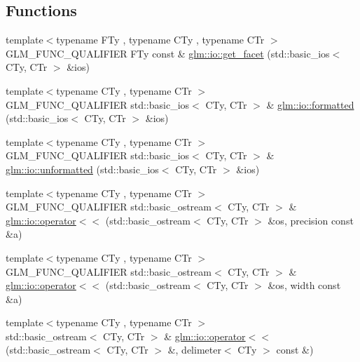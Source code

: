 \subsection*{Functions}
\begin{DoxyCompactItemize}
\item 
{\footnotesize template$<$typename F\+Ty , typename C\+Ty , typename C\+Tr $>$ }\\G\+L\+M\+\_\+\+F\+U\+N\+C\+\_\+\+Q\+U\+A\+L\+I\+F\+I\+E\+R F\+Ty const \& \hyperlink{namespaceglm_1_1io_a9e8927cf032254b0eee4ec650286e1f9}{glm\+::io\+::get\+\_\+facet} (std\+::basic\+\_\+ios$<$ C\+Ty, C\+Tr $>$ \&ios)
\item 
{\footnotesize template$<$typename C\+Ty , typename C\+Tr $>$ }\\G\+L\+M\+\_\+\+F\+U\+N\+C\+\_\+\+Q\+U\+A\+L\+I\+F\+I\+E\+R std\+::basic\+\_\+ios$<$ C\+Ty, C\+Tr $>$ \& \hyperlink{namespaceglm_1_1io_a61bbd0ea648623b0b07215a986bd5aa5}{glm\+::io\+::formatted} (std\+::basic\+\_\+ios$<$ C\+Ty, C\+Tr $>$ \&ios)
\item 
{\footnotesize template$<$typename C\+Ty , typename C\+Tr $>$ }\\G\+L\+M\+\_\+\+F\+U\+N\+C\+\_\+\+Q\+U\+A\+L\+I\+F\+I\+E\+R std\+::basic\+\_\+ios$<$ C\+Ty, C\+Tr $>$ \& \hyperlink{namespaceglm_1_1io_a833a8c96b3d84f7aa76e0c3e6845503e}{glm\+::io\+::unformatted} (std\+::basic\+\_\+ios$<$ C\+Ty, C\+Tr $>$ \&ios)
\item 
{\footnotesize template$<$typename C\+Ty , typename C\+Tr $>$ }\\G\+L\+M\+\_\+\+F\+U\+N\+C\+\_\+\+Q\+U\+A\+L\+I\+F\+I\+E\+R std\+::basic\+\_\+ostream$<$ C\+Ty, C\+Tr $>$ \& \hyperlink{namespaceglm_1_1io_ac52a8c5f8ea189f5bae2e5b8e382675f}{glm\+::io\+::operator$<$$<$} (std\+::basic\+\_\+ostream$<$ C\+Ty, C\+Tr $>$ \&os, precision const \&a)
\item 
{\footnotesize template$<$typename C\+Ty , typename C\+Tr $>$ }\\G\+L\+M\+\_\+\+F\+U\+N\+C\+\_\+\+Q\+U\+A\+L\+I\+F\+I\+E\+R std\+::basic\+\_\+ostream$<$ C\+Ty, C\+Tr $>$ \& \hyperlink{namespaceglm_1_1io_ac4783e4e3b0384619625d5d2d00c27b8}{glm\+::io\+::operator$<$$<$} (std\+::basic\+\_\+ostream$<$ C\+Ty, C\+Tr $>$ \&os, width const \&a)
\item 
{\footnotesize template$<$typename C\+Ty , typename C\+Tr $>$ }\\std\+::basic\+\_\+ostream$<$ C\+Ty, C\+Tr $>$ \& \hyperlink{namespaceglm_1_1io_a721b0bde3ed5f7d7b11a1d90d22a8ad3}{glm\+::io\+::operator$<$$<$} (std\+::basic\+\_\+ostream$<$ C\+Ty, C\+Tr $>$ \&, delimeter$<$ C\+Ty $>$ const \&)

\end{DoxyCompactItemize}

